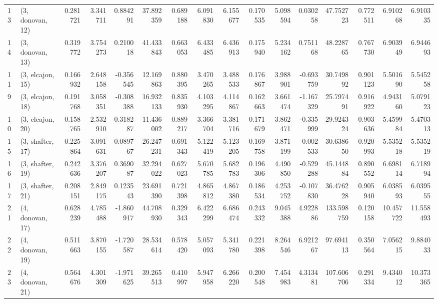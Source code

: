 \begin{tabular}{llrrrrrrrrrrrrrr}
13 &  (3, donovan, 12) &   0.281721 &  3.341711 &  0.884291 &  37.892359 &  0.689188 &   6.091830 &  6.155677 &  0.170535 &   5.098594 &  0.030258 &   47.752723 &  0.772511 &   6.910268 &   6.910335 \\
14 &  (3, donovan, 13) &   0.319772 &  3.754273 &  0.210018 &  41.433843 &  0.663053 &   6.433485 &  6.436913 &  0.175940 &   5.234162 &  0.751168 &   48.228765 &  0.767730 &   6.903949 &   6.944693 \\
11 &  (3, elcajon, 15) &   0.166932 &  2.648158 & -0.356545 &  12.169863 &  0.880395 &   3.470265 &  3.488533 &  0.176867 &   3.988901 & -0.693759 &   30.749892 &  0.901123 &   5.501690 &   5.545258 \\
9  &  (3, elcajon, 18) &   0.191768 &  3.058351 & -0.308388 &  16.932133 &  0.835930 &   4.103295 &  4.114867 &  0.162663 &   3.661474 & -1.167329 &   25.797491 &  0.916922 &   4.943160 &   5.079123 \\
10 &  (3, elcajon, 20) &   0.158765 &  2.532910 &  0.318287 &  11.436002 &  0.889217 &   3.366704 &  3.381716 &  0.171679 &   3.862471 & -0.335999 &   29.924324 &  0.903636 &   5.459984 &   5.470313 \\
15 &  (3, shafter, 17) &   0.225864 &  3.091631 &  0.089767 &  26.247231 &  0.691343 &   5.122419 &  5.123205 &  0.169758 &   3.871199 & -0.002533 &   30.638650 &  0.920993 &   5.535218 &   5.535219 \\
16 &  (3, shafter, 19) &   0.242636 &  3.376207 &  0.369087 &  32.294022 &  0.627023 &   5.670785 &  5.682783 &  0.196306 &   4.490850 & -0.529288 &   45.144884 &  0.890552 &   6.698114 &   6.718994 \\
17 &  (3, shafter, 21) &   0.208151 &  2.849175 &  0.123543 &  23.691390 &  0.721398 &   4.865812 &  4.867380 &  0.186534 &   4.253752 & -0.107830 &   36.476228 &  0.905940 &   6.038593 &   6.039555 \\
21 &  (4, donovan, 17) &   0.628239 &  4.785488 & -1.860917 &  44.708930 &  0.329343 &   6.422299 &  6.686474 &  0.243332 &   9.045388 &  4.922886 &  133.598759 &  0.120158 &  10.457722 &  11.558493 \\
22 &  (4, donovan, 19) &   0.511663 &  3.870155 & -1.720587 &  28.534614 &  0.578420 &   5.057093 &  5.341780 &  0.221398 &   8.264546 &  6.921267 &   97.694113 &  0.350564 &   7.056215 &   9.884033 \\
23 &  (4, donovan, 21) &   0.564676 &  4.301309 & -1.971625 &  39.265513 &  0.410997 &   5.947958 &  6.266220 &  0.200548 &   7.454983 &  4.313481 &  107.606706 &  0.291334 &   9.434012 &  10.373365 \\

\end{tabular}
